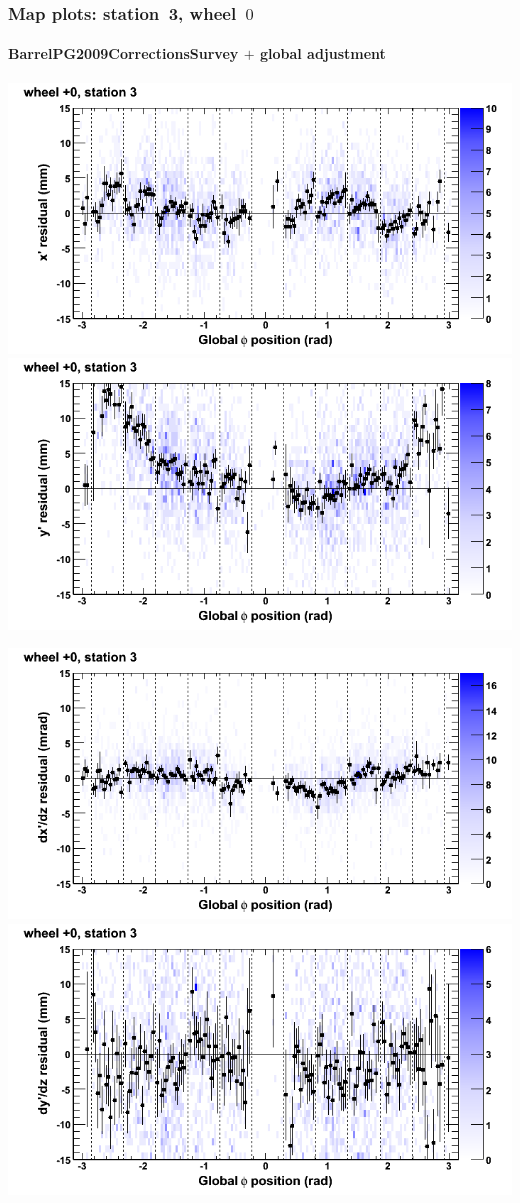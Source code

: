 \documentclass[compress]{beamer}
\begin{document}
\begin{frame}
\frametitle{Map plots: station~3, wheel~$0$}
\framesubtitle{BarrelPG2009CorrectionsSurvey $+$ global adjustment}
\includegraphics[width=0.5\linewidth]{mapplots_re01/DTvsphi_st3whC_x.png}
\includegraphics[width=0.5\linewidth]{mapplots_re01/DTvsphi_st3whC_y.png}

\includegraphics[width=0.5\linewidth]{mapplots_re01/DTvsphi_st3whC_dxdz.png}
\includegraphics[width=0.5\linewidth]{mapplots_re01/DTvsphi_st3whC_dydz.png}
\end{frame}
\end{document}
